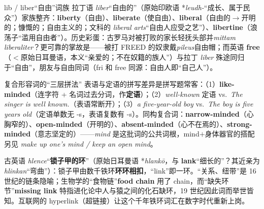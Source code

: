 \documentclass[../main.tex]{subfiles}
\begin{document}
\begin{gram}{lib / liber“自由”词族}
拉丁语 \textit{liber}“自由的”（原始印欧语 *\textit{leudh-}“成长、属于民众”）家族整齐：\textbf{liberty}（自由）、\textbf{liberate}（使自由）、\textbf{liberal}（自由的$\to$开明的；慷慨的；自由主义的；文科的 \textit{liberal arts}“自由人应受之艺”）、\textbf{libertine}（浪荡子“滥用自由者”）。历史彩蛋：古罗马对被打败的家长轻抚头部并\textit{mittam liberaliter}？更可靠的掌故是——被打 FREED 的奴隶戴\textit{pileus}自由帽；而英语 \textbf{free}（$<$原始日耳曼语，本义“亲爱的；不在奴籍的族人”）与拉丁 \textit{liber} 殊途同归于“自由”，朋友与自由同词（fri 和 free 同源：自由人即“自己人”）。
\end{gram}



\begin{gram}{复合形容词的“三层拼法”}
表语与定语的拼写差异是拼写题常客：（1）\textbf{like-minded}（连字符 + 名词过去分词，作\textbf{定语}）；（2）\textit{well-known} 定语 vs.\ \textit{The singer is well known.}（表语常断开）；（3）\textit{a five-year-old boy} vs.\ \textit{The boy is five years old}（定语单数无 -s，表语复数有 -s）。同构复合词：\textbf{narrow-minded}（心胸窄的）、\textbf{open-minded}（开明的）、\textbf{absent-minded}（心不在焉的）、\textbf{strong-minded}（意志坚定的）——\textit{mind} 是这批词的公共词根，mind$+$身体器官的搭配另见 \textit{make up one's mind / keep an open mind}。
\end{gram}




\begin{origin}
古英语 \textit{hlence}“\textbf{锁子甲的环}”（原始日耳曼语 *\textit{hlankō}，与 \textbf{lank}“细长的”？其近亲为 \textit{hlinkan}“弯曲”）：锁子甲由数千铁环\textbf{环环相扣}，“link”即一环。“关系、纽带”是 16 世纪的链条隐喻；生物学的“食物链”\textbf{food chain} 用了 chain，而“缺失环节”\textbf{missing link} 特指进化论中人与猿之间的化石缺环，19 世纪因此词而举世皆知。互联网的 hyperlink（超链接）让这个千年铁环词汇在数字时代重新上岗。
\end{origin}
\end{document}
